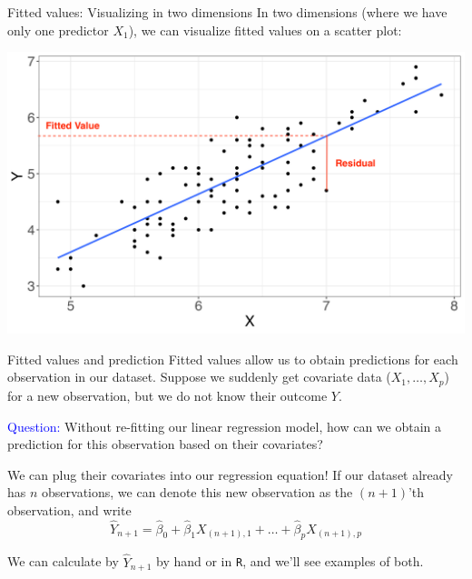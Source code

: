 \documentclass[10pt,t]{beamer}
\begin{document}
\begin{frame}{Fitted values: Visualizing in two dimensions}
In two dimensions (where we have only one predictor $X_1$), we can visualize fitted values on a scatter plot:
\vspace{0.3cm}

\centering \includegraphics[scale=0.4]{figures/fitted_vals2.png}
\end{frame}

\begin{frame}{Fitted values and prediction}
Fitted values allow us to obtain predictions for each observation in our dataset. Suppose we suddenly get covariate data ($X_1, \dots, X_p$) for a new observation, but we do not know their outcome $Y$. 

\vspace{0.3cm} 

\textcolor{blue}{Question:} Without re-fitting our linear regression model, how can we obtain a prediction for this observation based on their covariates? \pause

\vspace{0.3cm}

We can plug their covariates into our regression equation! If our dataset already has $n$ observations, we can denote this new observation as the $(n + 1)$'th observation, and write
$$
\hat{Y}_{n + 1} = \hat{\beta}_0 + \hat{\beta}_1 X_{(n + 1), 1} + \dots + \hat{\beta}_p X_{(n + 1), p}
$$

We can calculate by $\hat{Y}_{n + 1}$ by hand or in \texttt{R}, and we'll see examples of both.

\end{frame}
\end{document}
